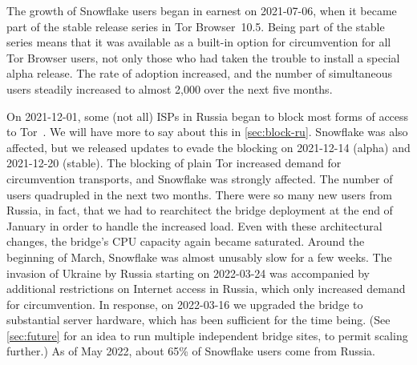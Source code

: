 \documentclass[letterpaper,twocolumn]{article}
\begin{document}
The growth of Snowflake users began in earnest on
\mbox{2021-07-06}, when it became part of the stable release series
in Tor Browser~10.5.
Being part of the stable series means that it was
available as a built-in option for circumvention for all Tor Browser users,
not only those who had taken the trouble to install a special alpha release.
The rate of adoption increased,
and the number of simultaneous users steadily increased to almost 2,000
over the next five months.

On \mbox{2021-12-01}, some (not all) ISPs in Russia began to block
most forms of access to Tor~\cite{ooni-2021-russia-blocks-tor}.
We will have more to say about this in \autoref{sec:block-ru}.
Snowflake was also affected,
but we released updates to evade the blocking on
\mbox{2021-12-14} (alpha) and
\mbox{2021-12-20} (stable).
The blocking of plain Tor increased demand for circumvention transports,
and Snowflake was strongly affected.
The number of users quadrupled in the next two months.
There were so many new users from Russia, in fact,
that we had to rearchitect the bridge deployment
at the end of January
in order to handle the increased load.
Even with these architectural changes,
the bridge's CPU capacity again became saturated.
Around the beginning of March, Snowflake was almost unusably slow for a few weeks.
The invasion of Ukraine by Russia starting on \mbox{2022-03-24}
was accompanied by additional restrictions on Internet access in Russia,
which only increased demand for circumvention.
In response, on \mbox{2022-03-16} we upgraded the bridge to substantial server hardware,
which has been sufficient for the time being.
(See \autoref{sec:future} for an idea to run multiple independent bridge sites,
to permit scaling further.)
As of May 2022, about 65\% of Snowflake users come from Russia.
%
\end{document}
